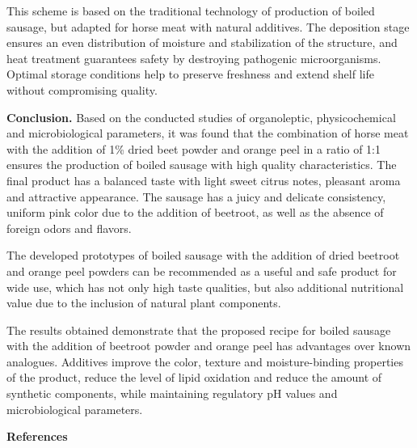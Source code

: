 \begin{multicols}{2}
This scheme is based on the traditional technology of production of
boiled sausage, but adapted for horse meat with natural additives. The
deposition stage ensures an even distribution of moisture and
stabilization of the structure, and heat treatment guarantees safety by
destroying pathogenic microorganisms. Optimal storage conditions help to
preserve freshness and extend shelf life without compromising quality.

{\bfseries Conclusion.} Based on the conducted studies of organoleptic,
physicochemical and microbiological parameters, it was found that the
combination of horse meat with the addition of 1\% dried beet powder and
orange peel in a ratio of 1:1 ensures the production of boiled sausage
with high quality characteristics. The final product has a balanced
taste with light sweet citrus notes, pleasant aroma and attractive
appearance. The sausage has a juicy and delicate consistency, uniform
pink color due to the addition of beetroot, as well as the absence of
foreign odors and flavors.

The developed prototypes of boiled sausage with the addition of dried
beetroot and orange peel powders can be recommended as a useful and safe
product for wide use, which has not only high taste qualities, but also
additional nutritional value due to the inclusion of natural plant
components.

The results obtained demonstrate that the proposed recipe for boiled
sausage with the addition of beetroot powder and orange peel has
advantages over known analogues. Additives improve the color, texture
and moisture-binding properties of the product, reduce the level of
lipid oxidation and reduce the amount of synthetic components, while
maintaining regulatory pH values and microbiological parameters.
\end{multicols}

\begin{center}
{\bfseries References}
\end{center}

